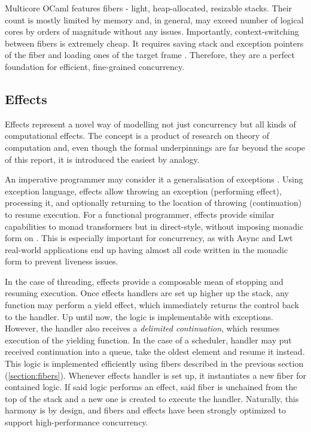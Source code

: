 \documentclass[12pt,a4paper,twoside]{report}
\begin{document}
Multicore OCaml features fibers - light, heap-allocated, resizable stacks. Their count is mostly limited by memory and, in general, may exceed number of logical cores by orders of magnitude without any issues. Importantly, context-switching between fibers is extremely cheap. It requires saving stack and exception pointers of the fiber and loading ones of the target frame \cite{Sivaramakrishnan2021}. Therefore, they are a perfect foundation for efficient, fine-grained concurrency. 



\subsection{Effects}
\label{section:effects}
Effects represent a novel way of modelling not just concurrency but all kinds of computational effects. The concept is a product of research on theory of computation \cite{Pretnar2015} and, even though the formal underpinnings are far beyond the scope of this report, it is introduced the easiest by analogy. 

An imperative programmer may consider it a generalisation of exceptions \cite{Brachthuser2020}. Using exception language, effects allow throwing an exception (performing effect), processing it, and optionally returning to the location of throwing (continuation) to resume execution. For a functional programmer, effects provide similar capabilities to monad transformers but in direct-style, without imposing monadic form on \cite{Sivaramakrishnan2021}. This is especially important for concurrency, as with Async and Lwt real-world applications end up having almost all code written in the monadic form to prevent liveness issues. 

In the case of threading, effects provide a composable mean of stopping and resuming execution. Once effects handlers are set up higher up the stack, any function may perform a yield effect, which immediately returns the control back to the handler. Up until now, the logic is implementable with exceptions. However, the handler also receives a \textit{delimited continuation}, which resumes execution of the yielding function. In the case of a scheduler, handler may put received continuation into a queue, take the oldest element and resume it instead. This logic is implemented efficiently using fibers described in the previous section (\ref{section:fibers}). Whenever effects handler is set up, it instantiates a new fiber for contained logic. If said logic performs an effect, said fiber is unchained from the top of the stack and a new one is created to execute the handler. Naturally, this harmony is by design, and fibers and effects have been strongly optimized to support high-performance concurrency. 
\end{document}
